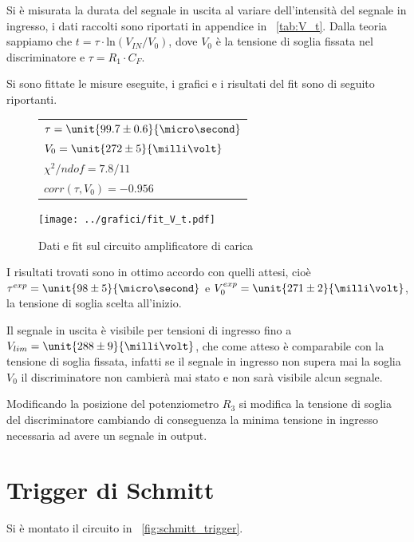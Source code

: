\documentclass[10pt,a4paper]{article}
\begin{document}
Si è misurata la durata del segnale in uscita al variare dell'intensità del segnale in ingresso, i dati raccolti sono riportati in appendice in \tablename{~\ref{tab:V_t}}.
Dalla teoria sappiamo che $t = \tau \cdot \text{ln}(V_{IN}/V_0)$, dove $V_0$ è la tensione di soglia fissata nel discriminatore e $\tau = R_1 \cdot C_F$.

Si sono fittate le misure eseguite, i grafici e i risultati del fit sono di seguito riportanti.

\begin{figure}[H]
	\begin{minipage}{0.28\textwidth}
		\centering
		\begin{tabular}{l}
			$\tau = \unit{99.7 \pm 0.6}{\micro\second}$ \\
			$V_0 = \unit{272 \pm 5}{\milli \volt}$ \\
			$\chi^2 / ndof = 7.8/11$\\
			$corr(\tau,V_0) = -0.956$\\
		\end{tabular}
	\end{minipage}
	\begin{minipage}{0.75\textwidth}
		\centering
		\texttt{[image: ../grafici/fit\_V\_t.pdf]}
		\caption{Dati e fit sul circuito amplificatore di carica}
		\label{}
	\end{minipage}
\end{figure}

I risultati trovati sono in ottimo accordo con quelli attesi, cioè $\tau^{exp} = \unit{98 \pm 5}{\micro\second}$ e $V_0^{exp} = \unit{271 \pm 2}{\milli\volt}$, la tensione di soglia scelta all'inizio.

Il segnale in uscita è visibile per tensioni di ingresso fino a $V_{lim} = \unit{288 \pm 9}{\milli\volt}$, che come atteso è comparabile con la tensione di soglia fissata, infatti se il segnale in ingresso non supera mai la soglia $V_0$ il discriminatore non cambierà mai stato e non sarà visibile alcun segnale.

Modificando la posizione del potenziometro $R_3$ si modifica la tensione di soglia del discriminatore cambiando di conseguenza la minima tensione in ingresso necessaria ad avere un segnale in output.

\section{Trigger di Schmitt}
Si è montato il circuito in \figurename{~\ref{fig:schmitt_trigger}}.
\end{document}
